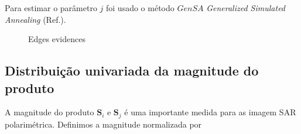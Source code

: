 \documentclass[remotesensing,article,submit,moreauthors,pdftex]{Definitions/mdpi}
\begin{document}
Para estimar o  parâmetro $j$ foi usado o método $GenSA$ \textit{Generalized Simulated Annealing} (Ref.\cite{xgsh}).

\begin{figure}[hbt]
	\centering
     \caption{Edges evidences}
     \label{evidencias_hh_hv_vv}
   \end{figure}

\subsection{Distribuição univariada da magnitude do produto}
A magnitude do produto $\mathbf{S}_i$ e $\mathbf{S}_j$ é uma importante medida para as imagem SAR polarimétrica. Definimos a magnitude normalizada por 
\end{document}
